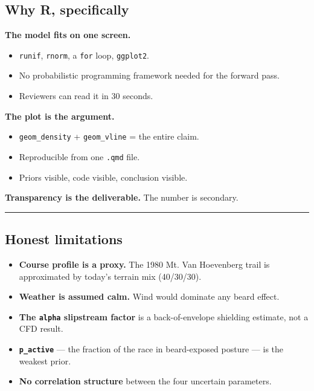 \documentclass[
  letterpaper,
  DIV=11,
  numbers=noendperiod]{scrartcl}
\providecommand{\tightlist}{%
  \setlength{\itemsep}{0pt}\setlength{\parskip}{0pt}}
\begin{document}
\subsection{Why R, specifically}\label{why-r-specifically}

\textbf{The model fits on one screen.}

\begin{itemize}
\tightlist
\item
  \texttt{runif}, \texttt{rnorm}, a \texttt{for} loop, \texttt{ggplot2}.
\item
  No probabilistic programming framework needed for the forward pass.
\item
  Reviewers can read it in 30 seconds.
\end{itemize}

\textbf{The plot is the argument.}

\begin{itemize}
\tightlist
\item
  \texttt{geom\_density} + \texttt{geom\_vline} = the entire claim.
\item
  Reproducible from one \texttt{.qmd} file.
\item
  Priors visible, code visible, conclusion visible.
\end{itemize}

\textbf{Transparency is the deliverable.} The number is secondary.

\begin{center}\rule{0.5\linewidth}{0.5pt}\end{center}

\subsection{Honest limitations}\label{honest-limitations}

\begin{itemize}
\tightlist
\item
  \textbf{Course profile is a proxy.} The 1980 Mt. Van Hoevenberg trail
  is approximated by today's terrain mix (40/30/30).
\item
  \textbf{Weather is assumed calm.} Wind would dominate any beard
  effect.
\item
  \textbf{The \texttt{alpha} slipstream factor} is a back-of-envelope
  shielding estimate, not a CFD result.
\item
  \textbf{\texttt{p\_active}} --- the fraction of the race in
  beard-exposed posture --- is the weakest prior.
\item
  \textbf{No correlation structure} between the four uncertain
  parameters.
\end{itemize}
\end{document}
